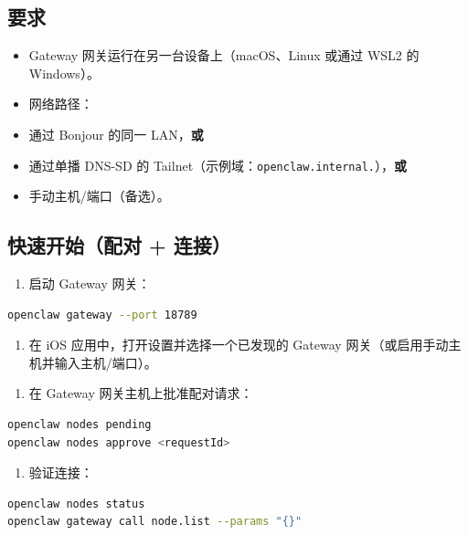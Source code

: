 \subsection{要求}


\begin{itemize}
  \item Gateway 网关运行在另一台设备上（macOS、Linux 或通过 WSL2 的 Windows）。
  \item 网络路径：
  \item 通过 Bonjour 的同一 LAN，\textbf{或}
  \item 通过单播 DNS-SD 的 Tailnet（示例域：\texttt{openclaw.internal.}），\textbf{或}
  \item 手动主机/端口（备选）。
\end{itemize}


\subsection{快速开始（配对 + 连接）}


\begin{enumerate}
  \item 启动 Gateway 网关：
\end{enumerate}


\begin{lstlisting}[language=bash]
openclaw gateway --port 18789
\end{lstlisting}


\begin{enumerate}
  \item 在 iOS 应用中，打开设置并选择一个已发现的 Gateway 网关（或启用手动主机并输入主机/端口）。
\end{enumerate}


\begin{enumerate}
  \item 在 Gateway 网关主机上批准配对请求：
\end{enumerate}


\begin{lstlisting}[language=bash]
openclaw nodes pending
openclaw nodes approve <requestId>
\end{lstlisting}


\begin{enumerate}
  \item 验证连接：
\end{enumerate}


\begin{lstlisting}[language=bash]
openclaw nodes status
openclaw gateway call node.list --params "{}"
\end{lstlisting}


